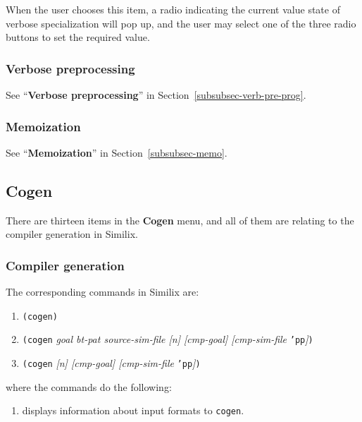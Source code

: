 \begin{sloppypar}
   When the user chooses this item, a radio indicating the current
value state of verbose specialization will pop up, and the user may
select one of the three radio buttons to set the required value.


\subsubsection{Verbose preprocessing}

See ``{\bf Verbose preprocessing}'' in
Section~\ref{subsubsec-verb-pre-prog}.


\subsubsection{Memoization}

See ``{\bf Memoization}'' in
Section~\ref{subsubsec-memo}.


\subsection{Cogen}

There are thirteen items in the {\bf Cogen} menu, and all of them are
relating to the compiler generation in Similix.


\subsubsection{Compiler generation}


The corresponding commands in Similix are:

\begin{enumerate}
\item {\tt (cogen)}
\item {\tt (cogen} {\it goal bt-pat source-sim-file [n] [cmp-goal]
      [cmp-sim-file} {\tt 'pp}{\it ]}{\tt )}
\item {\tt (cogen} {\it [n] [cmp-goal] [cmp-sim-file} {\tt 'pp}{\it ]}{\tt )}
\end{enumerate}

\noindent where the commands do the following:

\begin{enumerate}
\item displays information about input formats to {\tt cogen}.


\end{enumerate}
\end{sloppypar}
